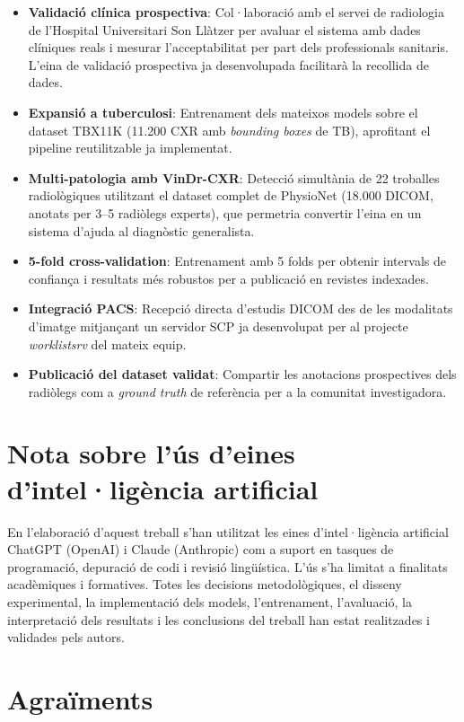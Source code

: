 \documentclass[conference]{IEEEtran}
\begin{document}
\begin{itemize}
    \item \textbf{Validació clínica prospectiva}: Col·laboració amb el servei de radiologia de l'Hospital Universitari Son Llàtzer per avaluar el sistema amb dades clíniques reals i mesurar l'acceptabilitat per part dels professionals sanitaris. L'eina de validació prospectiva ja desenvolupada facilitarà la recollida de dades.
    \item \textbf{Expansió a tuberculosi}: Entrenament dels mateixos models sobre el dataset TBX11K (11.200 CXR amb \textit{bounding boxes} de TB), aprofitant el pipeline reutilitzable ja implementat.
    \item \textbf{Multi-patologia amb VinDr-CXR}: Detecció simultània de 22 troballes radiològiques utilitzant el dataset complet de PhysioNet (18.000 DICOM, anotats per 3--5 radiòlegs experts), que permetria convertir l'eina en un sistema d'ajuda al diagnòstic generalista.
    \item \textbf{5-fold cross-validation}: Entrenament amb 5 folds per obtenir intervals de confiança i resultats més robustos per a publicació en revistes indexades.
    \item \textbf{Integració PACS}: Recepció directa d'estudis DICOM des de les modalitats d'imatge mitjançant un servidor SCP ja desenvolupat per al projecte \textit{worklistsrv} del mateix equip.
    \item \textbf{Publicació del dataset validat}: Compartir les anotacions prospectives dels radiòlegs com a \textit{ground truth} de referència per a la comunitat investigadora.
\end{itemize}

\section*{Nota sobre l'ús d'eines d'intel·ligència artificial}

En l'elaboració d'aquest treball s'han utilitzat les eines d'intel·ligència artificial ChatGPT (OpenAI) i Claude (Anthropic) com a suport en tasques de programació, depuració de codi i revisió lingüística. L'ús s'ha limitat a finalitats acadèmiques i formatives. Totes les decisions metodològiques, el disseny experimental, la implementació dels models, l'entrenament, l'avaluació, la interpretació dels resultats i les conclusions del treball han estat realitzades i validades pels autors.

\section*{Agraïments}
\end{document}
